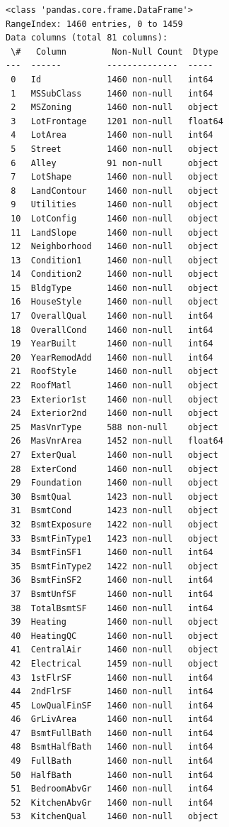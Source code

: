 \documentclass[11pt]{article}
\begin{document}
    \begin{Verbatim}[commandchars=\\\{\}]
<class 'pandas.core.frame.DataFrame'>
RangeIndex: 1460 entries, 0 to 1459
Data columns (total 81 columns):
 \#   Column         Non-Null Count  Dtype
---  ------         --------------  -----
 0   Id             1460 non-null   int64
 1   MSSubClass     1460 non-null   int64
 2   MSZoning       1460 non-null   object
 3   LotFrontage    1201 non-null   float64
 4   LotArea        1460 non-null   int64
 5   Street         1460 non-null   object
 6   Alley          91 non-null     object
 7   LotShape       1460 non-null   object
 8   LandContour    1460 non-null   object
 9   Utilities      1460 non-null   object
 10  LotConfig      1460 non-null   object
 11  LandSlope      1460 non-null   object
 12  Neighborhood   1460 non-null   object
 13  Condition1     1460 non-null   object
 14  Condition2     1460 non-null   object
 15  BldgType       1460 non-null   object
 16  HouseStyle     1460 non-null   object
 17  OverallQual    1460 non-null   int64
 18  OverallCond    1460 non-null   int64
 19  YearBuilt      1460 non-null   int64
 20  YearRemodAdd   1460 non-null   int64
 21  RoofStyle      1460 non-null   object
 22  RoofMatl       1460 non-null   object
 23  Exterior1st    1460 non-null   object
 24  Exterior2nd    1460 non-null   object
 25  MasVnrType     588 non-null    object
 26  MasVnrArea     1452 non-null   float64
 27  ExterQual      1460 non-null   object
 28  ExterCond      1460 non-null   object
 29  Foundation     1460 non-null   object
 30  BsmtQual       1423 non-null   object
 31  BsmtCond       1423 non-null   object
 32  BsmtExposure   1422 non-null   object
 33  BsmtFinType1   1423 non-null   object
 34  BsmtFinSF1     1460 non-null   int64
 35  BsmtFinType2   1422 non-null   object
 36  BsmtFinSF2     1460 non-null   int64
 37  BsmtUnfSF      1460 non-null   int64
 38  TotalBsmtSF    1460 non-null   int64
 39  Heating        1460 non-null   object
 40  HeatingQC      1460 non-null   object
 41  CentralAir     1460 non-null   object
 42  Electrical     1459 non-null   object
 43  1stFlrSF       1460 non-null   int64
 44  2ndFlrSF       1460 non-null   int64
 45  LowQualFinSF   1460 non-null   int64
 46  GrLivArea      1460 non-null   int64
 47  BsmtFullBath   1460 non-null   int64
 48  BsmtHalfBath   1460 non-null   int64
 49  FullBath       1460 non-null   int64
 50  HalfBath       1460 non-null   int64
 51  BedroomAbvGr   1460 non-null   int64
 52  KitchenAbvGr   1460 non-null   int64
 53  KitchenQual    1460 non-null   object

\end{Verbatim}
\end{document}
